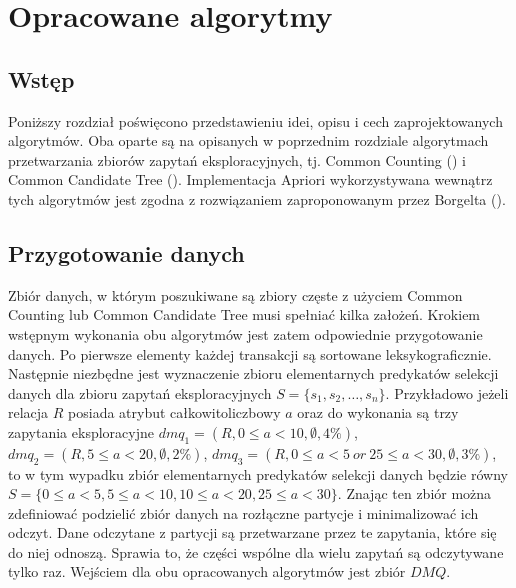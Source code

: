 \chapter{Opracowane algorytmy}
\label{c4}

\section{Wstęp}
\label{c41}
Poniższy rozdział poświęcono przedstawieniu idei, opisu i cech zaprojektowanych algorytmów. Oba oparte są na opisanych w poprzednim rozdziale algorytmach przetwarzania zbiorów zapytań eksploracyjnych, tj. Common Counting (\cite{WojciechowskiCC}) i Common Candidate Tree (\cite{WojciechowskiCCT}). Implementacja Apriori wykorzystywana wewnątrz tych algorytmów jest zgodna z rozwiązaniem zaproponowanym przez Borgelta (\cite{Borgelt}). 

\section{Przygotowanie danych}
\label{c42}
Zbiór danych, w którym poszukiwane są zbiory częste z użyciem Common Counting lub Common Candidate Tree musi spełniać kilka założeń. Krokiem wstępnym wykonania obu algorytmów jest zatem odpowiednie przygotowanie danych. Po pierwsze elementy każdej transakcji są sortowane leksykograficznie. Następnie niezbędne jest wyznaczenie zbioru elementarnych predykatów selekcji danych dla zbioru zapytań eksploracyjnych \(S = \{s_1, s_2, \dots, s_n\}\). Przykładowo jeżeli relacja \(R\) posiada atrybut całkowitoliczbowy \(a\) oraz do wykonania są trzy zapytania eksploracyjne \(dmq_1=(R, 0 \leq a < 10, \emptyset, 4\%)\), \(dmq_2=(R, 5\leq a < 20, \emptyset, 2\%)\), \(dmq_3=(R, 0\leq a < 5~or~25\leq a < 30, \emptyset, 3\%)\), to w tym wypadku zbiór elementarnych predykatów selekcji danych będzie równy  \(S = \{0\leq a < 5, 5\leq a < 10, 10\leq a < 20, 25\leq a < 30\}\). Znając ten zbiór można zdefiniować podzielić zbiór danych na rozłączne partycje i minimalizować ich odczyt. Dane odczytane z partycji są przetwarzane przez te zapytania, które się do niej odnoszą. Sprawia to, że części wspólne dla wielu zapytań są odczytywane tylko raz. Wejściem dla obu opracowanych algorytmów jest zbiór \(DMQ\).

